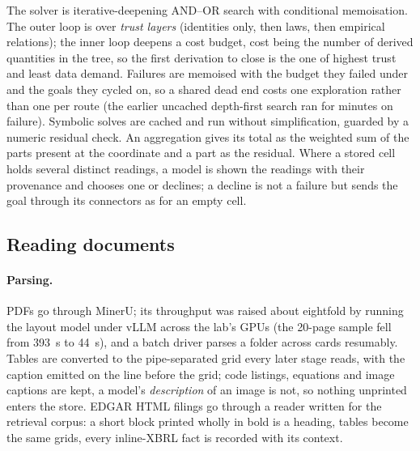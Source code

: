 The solver is iterative-deepening AND--OR search with conditional memoisation. The outer loop is over \emph{trust layers} (identities only, then laws, then empirical relations); the inner loop deepens a cost budget, cost being the number of derived quantities in the tree, so the first derivation to close is the one of highest trust and least data demand. Failures are memoised with the budget they failed under and the goals they cycled on, so a shared dead end costs one exploration rather than one per route (the earlier uncached depth-first search ran for minutes on failure). Symbolic solves are cached and run without simplification, guarded by a numeric residual check. An aggregation gives its total as the weighted sum of the parts present at the coordinate and a part as the residual. Where a stored cell holds several distinct readings, a model is shown the readings with their provenance and chooses one or declines; a decline is not a failure but sends the goal through its connectors as for an empty cell.

\subsection{Reading documents}
\label{sec:impl-reading}

\paragraph{Parsing.}
PDFs go through MinerU; its throughput was raised about eightfold by running the layout model under vLLM across the lab's GPUs (the 20-page sample fell from 393~s to 44~s), and a batch driver parses a folder across cards resumably. Tables are converted to the pipe-separated grid every later stage reads, with the caption emitted on the line before the grid; code listings, equations and image captions are kept, a model's \emph{description} of an image is not, so nothing unprinted enters the store. EDGAR HTML filings go through a reader written for the retrieval corpus: a short block printed wholly in bold is a heading, tables become the same grids, every inline-XBRL fact is recorded with its context.

